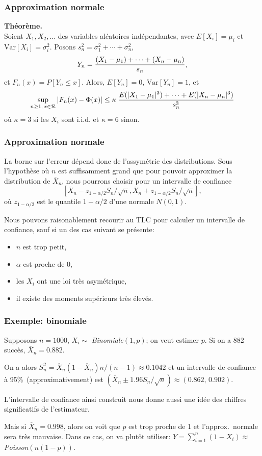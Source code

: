 \documentclass[t,usepdftitle=false]{beamer}
\def\RR{\mathcal{R}}
\def\Var{\mbox{Var}}
\def\iid{i.i.d.}
\begin{document}
\begin{frame}
\frametitle{Approximation normale}

{\bf Théorème.}\\
Soient $X_1,X_2,\dots$ des variables aléatoires indépendantes, avec  $E[X_i]=\mu_i$ et $\Var[X_i] = \sigma_i^2$.
Posons ${s_n^2} = \sigma_1^2 + \cdots + \sigma_n^2$,
$$
  {Y_n} = {(X_1-\mu_1) + \cdots + (X_n-\mu_n) \over s_n },
$$
et ${F_n(x)} = P[Y_n\le x]$. Alors, $E[Y_n]=0$, $\Var[Y_n]=1$, et
\[
 \sup_{n\ge 1,\, x\in\RR} |F_n(x) - \Phi(x)|
  \le \kappa\; {E(|X_1-\mu_1|^3) + \cdots + E(|X_n-\mu_n|^3) \over s_n^3}
\]
où $\kappa=3$ si les $X_i$ sont \iid{} et $\kappa=6$ sinon.

\end{frame}

\begin{frame}
\frametitle{Approximation normale}

La borne sur l'erreur dépend donc de l'assymétrie des distributions.
Sous l'hypothèse où $n$ est suffisamment grand que pour pouvoir approximer la distribution de $\overline{X}_n$,
nous pourrons choisir pour un intervalle de confiance
\[
\left[ \overline{X}_n - z_{1-\alpha/2}S_n/{\sqrt{n}}, \overline{X}_n + z_{1-\alpha/2}S_n/{\sqrt{n}} \right],
\]
où $z_{1-\alpha/2}$ est le quantile $1-\alpha/2$ d'une normale $N(0,1)$.

\mbox{}

Nous pouvons raisonablement recourir au TLC pour calculer un intervalle de
confiance, sauf si un des cas suivant se présente:
\begin{itemize}
\item
$n$ est trop petit,
\item
$\alpha$ est proche de 0,
\item
les $X_i$ ont une loi très asymétrique,
\item
il existe des moments supérieurs très élevés.
\end{itemize}

\end{frame}

\begin{frame}
\frametitle{Exemple: binomiale}

Supposons ${n}=1000$, $X_i \sim$ \emph{Binomiale}$(1,p)$; on veut estimer ${p}$.
Si on a 882 succès, $\overline{X}_n = {0.882}$.

\mbox{}

On a alors $S_n^2 = \overline{X}_n (1-\overline{X}_n) n/(n-1) \approx {0.1042}$
et un intervalle de confiance à 95\%\ (approximativement) est
$(\overline{X}_n \pm 1.96 S_n/\sqrt{n}) \approx (0.862,\, 0.902)$.

\mbox{}

L'intervalle de confiance ainsi construit nous donne aussi une idée
des chiffres significatifs de l'estimateur.

\mbox{}

Mais si $\overline{X}_n = {0.998}$, alors on voit que $p$ est trop proche de 1
et l'approx.\ normale sera très mauvaise.
Dans ce cas, on va plutôt utiliser:
$Y = \sum_{i=1}^n (1-X_i) \approx $ \emph{Poisson$(n(1-p))$}.

\end{frame}
\end{document}
